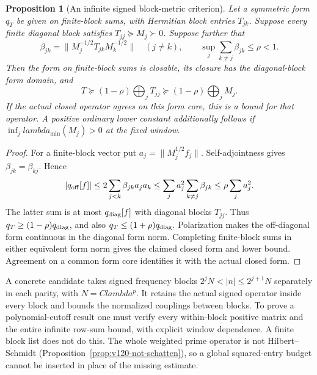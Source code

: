\documentclass[11pt]{article}
\def\lambda{lambda}%
\newtheorem{proposition}[theorem]{Proposition}
\theoremstyle{remark}
\begin{document}
\begin{proposition}[An infinite signed block-metric criterion]
\label{prop:v127-block-metric}
Let a symmetric form $q_T$ be given on finite-block sums,
with Hermitian block entries $T_{jk}$. Suppose every finite diagonal
block satisfies $T_{jj}\succeq M_j\succ0$. Suppose further that
\[
 \beta_{jk}=\|M_j^{-1/2}T_{jk}M_k^{-1/2}\|\quad(j\ne k),\qquad
 \sup_j\sum_{k\ne j}\beta_{jk}\le\rho<1.
\]
Then the form on finite-block sums is closable, its closure has the
diagonal-block form domain, and
\[
 T\succeq(1-\rho)\bigoplus_jT_{jj}
   \succeq(1-\rho)\bigoplus_jM_j.
\]
If the actual closed operator agrees on this form core, this is a
bound for that operator. A positive ordinary lower constant additionally
follows if $\inf_j\lambda_{\min}(M_j)>0$ at the fixed window.
\end{proposition}
\begin{proof}
For a finite-block vector put $a_j=\|M_j^{1/2}f_j\|$.
Self-adjointness gives $\beta_{jk}=\beta_{kj}$. Hence
\[
 |q_{\rm off}[f]|\le2\sum_{j<k}\beta_{jk}a_ja_k
 \le\sum_j a_j^2\sum_{k\ne j}\beta_{jk}
 \le\rho\sum_j a_j^2.
\]
The latter sum is at most $q_{\rm diag}[f]$ with diagonal blocks
$T_{jj}$. Thus $q_T\ge(1-\rho)q_{\rm diag}$, and also
$q_T\le(1+\rho)q_{\rm diag}$. Polarization makes the off-diagonal
form continuous in the diagonal form norm. Completing finite-block
sums in either equivalent form norm gives the claimed closed form
and lower bound. Agreement on a common form core identifies it with
the actual closed form.
\end{proof}

A concrete candidate takes signed frequency blocks
$2^jN<|n|\le2^{j+1}N$ separately in each parity, with
$N=C\lambda^p$. It retains the actual signed operator inside every
block and bounds the normalized couplings between blocks. To prove
a polynomial-cutoff result one must verify every within-block positive
matrix and the entire infinite row-sum bound, with explicit window
dependence. A finite block list does not do this. The whole weighted
prime operator is not Hilbert--Schmidt
(Proposition~\ref{prop:v120-not-schatten}), so a global squared-entry
budget cannot be inserted in place of the missing estimate.
\end{document}
